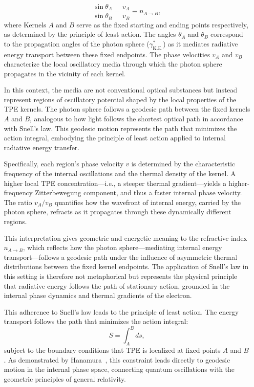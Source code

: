 \documentclass[%
 reprint,
 amsmath,amssymb,
 aps,
]{revtex4-1}
\numberwithin{equation}{section}%
\begin{document}
\begin{equation}
\frac{\sin \theta_A}{\sin \theta_B} = \frac{v_A}{v_B} \equiv n_{A \to B},
\end{equation}
where Kernels $A$ and $B$ serve as the fixed starting and ending points respectively, as determined by the principle of least action. The angles $\theta_A$ and $\theta_B$ correspond to the propagation angles of the photon sphere ($\gamma^*_{\mathrm{K.E.}}$) as it mediates radiative energy transport between these fixed endpoints. The phase velocities $v_A$ and $v_B$ characterize the local oscillatory media through which the photon sphere propagates in the vicinity of each kernel.

In this context, the media are not conventional optical substances but instead represent regions of oscillatory potential shaped by the local properties of the TPE kernels. The photon sphere follows a geodesic path between the fixed kernels $A$ and $B$, analogous to how light follows the shortest optical path in accordance with Snell's law. This geodesic motion represents the path that minimizes the action integral, embodying the principle of least action applied to internal radiative energy transfer.

Specifically, each region's phase velocity $v$ is determined by the characteristic frequency of the internal oscillations and the thermal density of the kernel. A higher local TPE concentration—i.e., a steeper thermal gradient—yields a higher-frequency Zitterbewegung component, and thus a faster internal phase velocity. The ratio $v_A / v_B$ quantifies how the wavefront of internal energy, carried by the photon sphere, refracts as it propagates through these dynamically different regions.

This interpretation gives geometric and energetic meaning to the refractive index $n_{A \to B}$, which reflects how the photon sphere—mediating internal energy transport—follows a geodesic path under the influence of asymmetric thermal distributions between the fixed kernel endpoints. The application of Snell's law in this setting is therefore not metaphorical but represents the physical principle that radiative energy follows the path of stationary action, grounded in the internal phase dynamics and thermal gradients of the electron.

This adherence to Snell's law leads to the principle of least action. The energy transport follows the path that minimizes the action integral:
\begin{equation}
S = \int_A^B ds,
\end{equation}
subject to the boundary conditions that TPE is localized at fixed points $A$ and $B$. As demonstrated by Hanamura~\cite{hanamura2024quantum}, this constraint leads directly to geodesic motion in the internal phase space, connecting quantum oscillations with the geometric principles of general relativity.
\end{document}
